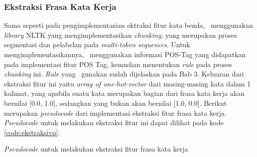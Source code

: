 \subsubsection{Ekstraksi Frasa Kata Kerja}
Sama seperti pada pengimplementasian ektraksi fitur kata benda, \saya~menggunakan \textit{library} NLTK \citep{bird2009nltk} yang mengimplementasikan \textit{chunking}, yang merupakan proses segmentasi dan pelabelan pada \textit{multi-token sequences}. Untuk mengimplementasikannya, \saya~menggunakan informasi POS-Tag yang didapatkan pada implementasi fitur POS Tag, kemudian menentukan \textit{rule} pada proses \textit{chunking} ini. \textit{Rule} yang \saya~gunakan sudah dijelaskan pada Bab 3. Keluaran dari ekstraksi fitur ini yaitu \textit{array of one-hot-vector} dari masing-masing kata dalam 1 kalimat, yang apabila suatu kata merupakan bagian dari frasa kata kerja akan bernilai [0.0, 1.0], sedangkan yang bukan akan bernilai [1.0, 0.0]. Berikut merupakan \textit{pseudocode} dari implementasi ekstraksi fitur frasa kata kerja. \textit{Pseudocode} untuk melakukan ekstraksi fitur ini dapat dilihat pada kode \ref{code:ekstraksivp}.

\begin{kode}

	
	\SetAlgoLined
	\BlankLine
	
	\BlankLine	
	\caption{\textit{Pseudocode} untuk melakukan ekstraksi fitur frasa kata kerja}
	\label{code:ekstraksivp}
\end{kode}

